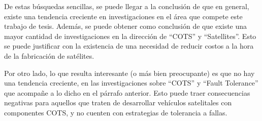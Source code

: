 De estas búsquedas sencillas, se puede llegar a la conclusión de que en general, existe una tendencia
creciente en investigaciones en el área que compete este trabajo de tesis. Además, se puede
obtener como conclusión de que existe una mayor cantidad de investigaciones en la dirección de
``COTS'' y ``Satellites''. Esto se puede justificar con la existencia de una necesidad de
reducir costos a la hora de la fabricación de satélites.

Por otro lado, lo que resulta interesante (o más bien preocupante) es que no hay una
tendencia creciente, en las investigaciones sobre ``COTS'' y ``Fault Tolerance''
que acompañe a lo dicho en el párrafo anterior. Esto puede traer consecuencias negativas
para aquellos que traten de desarrollar vehículos satelitales con componentes COTS, y no
cuenten con estrategias de tolerancia a fallas.


